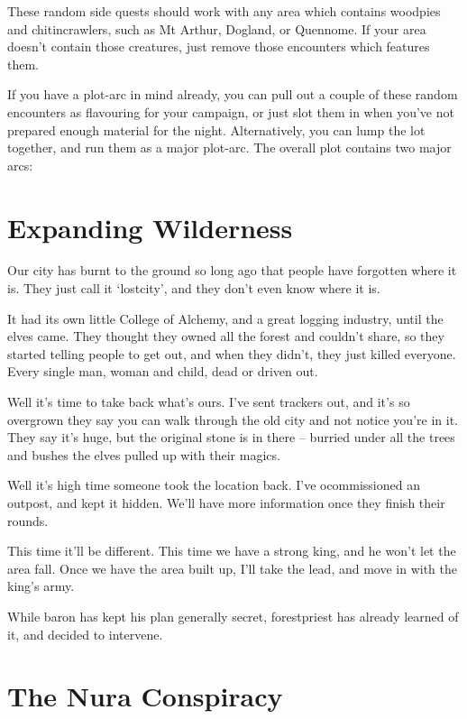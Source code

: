These random side quests should work with any area which contains woodpies and chitincrawlers, such as Mt Arthur, Dogland, or Quennome.
If your area doesn't contain those creatures, just remove those encounters which features them.

If you have a plot-arc in mind already, you can pull out a couple of these random encounters as flavouring for your campaign, or just slot them in when you've not prepared enough material for the night.  Alternatively, you can lump the lot together, and run them as a major plot-arc.  The overall plot contains two major arcs:

\section{Expanding Wilderness}

\begin{speechtext}

	Our city has burnt to the ground so long ago that people have forgotten where it is.  They just call it `\gls{lostcity}', and they don't even know where it is.

	It had its own little College of Alchemy, and a great logging industry, until the elves came.  They thought they owned all the forest and couldn't share, so they started telling people to get out, and when they didn't, they just killed everyone.  Every single man, woman and child, dead or driven out.

	Well it's time to take back what's ours.  I've sent trackers out, and it's so overgrown they say you can walk through the old city and not notice you're in it.  They say it's huge, but the original stone is in there -- burried under all the trees and bushes the elves pulled up with their magics.

	Well it's high time someone took the location back.  I've ocommissioned an outpost, and kept it hidden.  We'll have more information once they finish their rounds.

	This time it'll be different.  This time we have a strong king, and he won't let the area fall.  Once we have the area built up, I'll take the lead, and move in with the king's army.

\end{speechtext}

While \gls{baron} has kept his plan generally secret, \gls{forestpriest} has already learned of it, and decided to intervene.

\section{The Nura Conspiracy}

